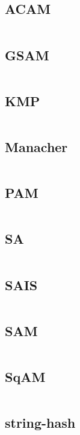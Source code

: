 \documentclass[a4]{article}
\begin{document}
\subsection{ACAM}
\inputminted[mathescape,linenos,numbersep=5pt,frame=lines,framesep=2mm]{cpp}{src/string/ACAM.cpp}
\subsection{GSAM}
\inputminted[mathescape,linenos,numbersep=5pt,frame=lines,framesep=2mm]{cpp}{src/string/GSAM.cpp}
\subsection{KMP}
\inputminted[mathescape,linenos,numbersep=5pt,frame=lines,framesep=2mm]{cpp}{src/string/KMP.cpp}
\subsection{Manacher}
\inputminted[mathescape,linenos,numbersep=5pt,frame=lines,framesep=2mm]{cpp}{src/string/Manacher.cpp}
\subsection{PAM}
\inputminted[mathescape,linenos,numbersep=5pt,frame=lines,framesep=2mm]{cpp}{src/string/PAM.cpp}
\subsection{SA}
\inputminted[mathescape,linenos,numbersep=5pt,frame=lines,framesep=2mm]{cpp}{src/string/SA.cpp}
\subsection{SAIS}
\inputminted[mathescape,linenos,numbersep=5pt,frame=lines,framesep=2mm]{cpp}{src/string/SAIS.cpp}
\subsection{SAM}
\inputminted[mathescape,linenos,numbersep=5pt,frame=lines,framesep=2mm]{cpp}{src/string/SAM.cpp}
\subsection{SqAM}
\inputminted[mathescape,linenos,numbersep=5pt,frame=lines,framesep=2mm]{cpp}{src/string/SqAM.cpp}
\subsection{string-hash}
\inputminted[mathescape,linenos,numbersep=5pt,frame=lines,framesep=2mm]{cpp}{src/string/string-hash.cpp}
\end{document}
